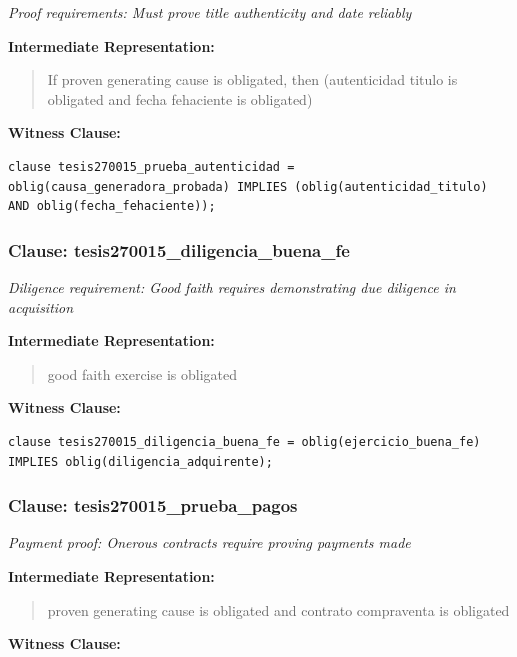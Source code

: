 \documentclass[11pt,a4paper]{article}
\begin{document}
\textit{Proof requirements: Must prove title authenticity and date reliably}

\textbf{Intermediate Representation:}

\begin{quote}
If proven generating cause is obligated, then (autenticidad titulo is obligated and fecha fehaciente is obligated)
\end{quote}

\textbf{Witness Clause:}

\begin{lstlisting}[style=witnessstyle, language=Witness]
clause tesis270015_prueba_autenticidad = oblig(causa_generadora_probada) IMPLIES (oblig(autenticidad_titulo) AND oblig(fecha_fehaciente));
\end{lstlisting}

\subsubsection{Clause: tesis270015\_diligencia\_buena\_fe}

\textit{Diligence requirement: Good faith requires demonstrating due diligence in acquisition}

\textbf{Intermediate Representation:}

\begin{quote}
good faith exercise is obligated
\end{quote}

\textbf{Witness Clause:}

\begin{lstlisting}[style=witnessstyle, language=Witness]
clause tesis270015_diligencia_buena_fe = oblig(ejercicio_buena_fe) IMPLIES oblig(diligencia_adquirente);
\end{lstlisting}

\subsubsection{Clause: tesis270015\_prueba\_pagos}

\textit{Payment proof: Onerous contracts require proving payments made}

\textbf{Intermediate Representation:}

\begin{quote}
proven generating cause is obligated and contrato compraventa is obligated
\end{quote}

\textbf{Witness Clause:}
\end{document}
